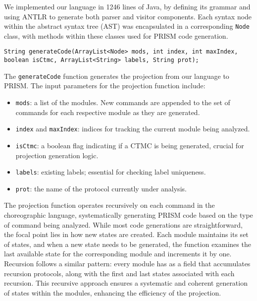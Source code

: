 We implemented our language in 1246 lines of Java, by defining its
grammar and using ANTLR \cite{ANTLR} to generate both parser and
visitor components. Each syntax node within the abstract syntax tree
(AST) was encapsulated in a corresponding {\tt Node} class, with
methods within these classes used for PRISM code generation.
\begin{lstlisting}[language=Eclipse,caption=The \texttt{generateCode} function,label=genfun1,numbers=none]
	String generateCode(ArrayList<Node> mods, int index, int maxIndex, boolean isCtmc, ArrayList<String> labels, String prot);	
\end{lstlisting}
The {\tt generateCode} function generates the projection from our language to PRISM.
The input parameters for the projection function include:
\begin{itemize}
\item \texttt{mods}: a list of the modules.  New commands are appended to the set of commands for each respective module as they are generated.
\item \texttt{index} and \texttt{maxIndex}: indices for tracking the current module being analyzed.
\item \texttt{isCtmc}: a boolean flag indicating if a CTMC is being generated, crucial for projection generation logic.
\item \texttt{labels}: existing labels; essential for checking label uniqueness.
\item \texttt{prot}: the name of the protocol currently under analysis.
\end{itemize}
The projection function operates recursively on each command in the
choreographic language, systematically generating PRISM code based on
the type of command being analyzed. While most code generations are
straightforward, the focal point lies in how new states are
created. Each module maintains its set of states, and when a new state
needs to be generated, the function examines the last available state
for the corresponding module and increments it by one.  Recursion
follows a similar pattern: every module has as a field %
that accumulates recursion protocols, along with the first and last
states associated with each recursion. This recursive approach ensures
a systematic and coherent generation of states within the modules,
enhancing the efficiency of the projection.

